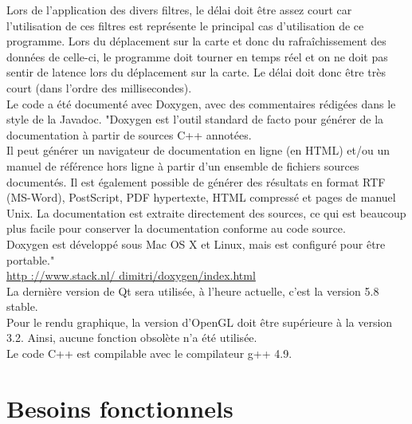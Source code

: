 \documentclass[12pt]{article}
\begin{document}
		Lors de l’application des divers filtres, le délai doit être assez court car l'utilisation
		de ces filtres est représente le principal cas d'utilisation de ce programme.
		Lors du déplacement sur la carte et donc du rafraîchissement des données de celle-ci,
		le programme doit tourner en temps réel et on ne doit pas sentir de latence lors du
		déplacement sur la carte. Le délai doit donc être très court (dans l’ordre des
		millisecondes).\\
		Le code a été documenté avec Doxygen, avec des commentaires rédigées dans le style de la Javadoc.
		"Doxygen est l’outil standard de facto pour générer de la documentation à partir de
		sources C++ annotées.\\
		Il peut générer un navigateur de documentation en ligne (en HTML) et/ou un manuel de
		référence hors ligne à partir d’un ensemble de fichiers sources documentés. Il est
		également possible de générer des résultats en format RTF (MS-Word), PostScript,
		PDF hypertexte, HTML compressé et pages de manuel Unix. La documentation est 
		extraite directement des sources, ce qui est beaucoup plus facile pour conserver
		la documentation conforme au code source. \\
		Doxygen est développé sous Mac OS X et Linux, mais est configuré pour être
		portable."\\
		
		\url{http ://www.stack.nl/ dimitri/doxygen/index.html} \\
		
		La dernière version de Qt sera utilisée, à l’heure actuelle, c’est la version
		5.8 stable.\\
		Pour le rendu graphique, la version d’OpenGL doit être supérieure à la version 3.2.
		Ainsi, aucune fonction obsolète n'a été utilisée.\\
		Le code C++ est compilable avec le compilateur g++ 4.9.
		
	\newpage
	\section{Besoins fonctionnels}
\end{document}
